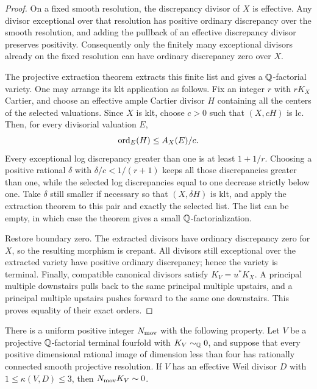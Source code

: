 \begin{proof}
On a fixed smooth resolution, the discrepancy divisor of \(X\) is
effective.  Any divisor exceptional over that resolution has positive
ordinary discrepancy over the smooth resolution, and adding the
pullback of an effective discrepancy divisor preserves positivity.
Consequently only the finitely many exceptional divisors already on
the fixed resolution can have ordinary discrepancy zero over \(X\).

The projective extraction theorem
\cite[Corollary~1.4.3]{BCHM2010} extracts this finite list and gives a
\(\mathbb Q\)-factorial variety.  One may arrange its klt application as
follows.  Fix an integer \(r\) with \(rK_X\) Cartier, and choose an
effective ample Cartier divisor \(H\) containing all the centers of
the selected valuations.  Since \(X\) is klt, choose \(c>0\) such that
\((X,cH)\) is lc.  Then, for every divisorial valuation \(E\),
\[
                      \operatorname{ord}_E(H)\le A_X(E)/c.
\]
Every exceptional log discrepancy greater than one is at least
\(1+1/r\).  Choosing a positive rational \(\delta\) with
\(\delta/c<1/(r+1)\) keeps all those discrepancies greater than one,
while the selected log discrepancies equal to one decrease strictly
below one.  Take \(\delta\) still smaller if necessary so that
\((X,\delta H)\) is klt, and apply the extraction theorem to this
pair and exactly the selected list.  The list can be empty, in which
case the theorem gives a small \(\mathbb Q\)-factorialization.

Restore boundary zero.  The extracted divisors have ordinary
discrepancy zero for \(X\), so the resulting morphism is crepant.
All divisors still exceptional over the extracted variety have
positive ordinary discrepancy; hence the variety is terminal.
Finally, compatible canonical divisors satisfy \(K_V=u^*K_X\).
A principal multiple downstairs pulls back to the same principal
multiple upstairs, and a principal multiple upstairs pushes forward
to the same one downstairs.  This proves equality of their exact
orders.
\end{proof}

\begin{lemma}\label{lem:index-moving-divisor}
There is a uniform positive integer \(N_{\rm mov}\) with the following
property.  Let \(V\) be a projective \(\mathbb Q\)-factorial terminal fourfold
with \(K_V\sim_{\mathbb Q}0\), and suppose that every positive dimensional
rational image of dimension less than four has rationally connected
smooth projective resolution.  If \(V\) has an effective Weil divisor
\(D\) with \(1\le\kappa(V,D)\le3\), then
\(N_{\rm mov}K_V\sim0\).
\end{lemma}


